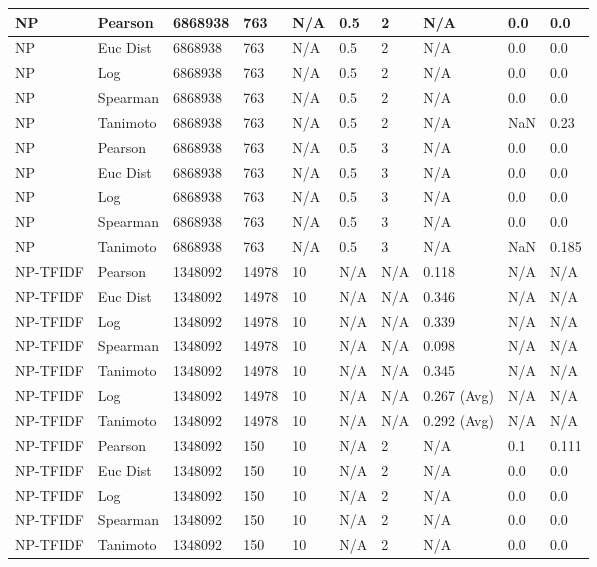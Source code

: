 \documentclass{article}
\begin{document}
\begin{longtable}{ |p{1.7cm}|p{1.9cm}|p{1.5cm}|p{1.5cm}|p{0.75cm}|p{0.75cm}|p{0.75cm}|p{0.75cm}|p{1.5cm}|p{1.5cm}|}
    NP & Pearson & 6868938 & 763 & N/A &  0.5  & 2 & N/A & 0.0 & 0.0  \\ \hline
    NP & Euc Dist & 6868938 & 763 & N/A &  0.5  &  2 & N/A &0.0 & 0.0   \\ \hline
    NP & Log & 6868938 & 763 & N/A &  0.5  &  2 & N/A & 0.0 & 0.0 \\ \hline
    NP & Spearman & 6868938 & 763 & N/A &  0.5  &  2 & N/A & 0.0 & 0.0 \\ \hline
    NP & Tanimoto & 6868938 & 763 & N/A &  0.5  &  2 & N/A & NaN & 0.23 \\ \hline
    
    NP & Pearson & 6868938 & 763 & N/A &  0.5  & 3 & N/A & 0.0 & 0.0  \\ \hline
    NP & Euc Dist & 6868938 & 763 & N/A &  0.5  & 3  & N/A &0.0 & 0.0   \\ \hline
    NP & Log & 6868938 & 763 & N/A &  0.5  & 3  & N/A & 0.0 & 0.0  \\ \hline
    NP & Spearman & 6868938 & 763 & N/A &  0.5  & 3  & N/A &0.0 & 0.0 \\ \hline
    NP & Tanimoto & 6868938 & 763 & N/A &  0.5  & 3 & N/A & NaN & 0.185 \\ \hline
    
    NP-TFIDF & Pearson & 1348092 & 14978 & 10 & N/A & N/A & 0.118 & N/A & N/A  \\ \hline
    NP-TFIDF  & Euc Dist & 1348092 & 14978 & 10 & N/A & N/A & 0.346 & N/A & N/A   \\ \hline
    NP-TFIDF  & Log & 1348092 & 14978 & 10 & N/A &  N/A& 0.339 & N/A & N/A  \\ \hline
    NP-TFIDF  & Spearman & 1348092 & 14978 & 10 & N/A & N/A & 0.098  & N/A & N/A \\ \hline
    NP-TFIDF  & Tanimoto & 1348092 & 14978 & 10 & N/A& N/A & 0.345 & N/A & N/A \\ \hline
    NP-TFIDF  & Log & 1348092 & 14978 & 10 & N/A& N/A & 0.267 (Avg) & N/A & N/A \\ \hline
    NP-TFIDF  & Tanimoto & 1348092 & 14978 & 10 & N/A & N/A & 0.292 (Avg) & N/A & N/A \\ \hline
    
    NP-TFIDF  & Pearson & 1348092 & 150 & 10 & N/A  & 2 & N/A & 0.1 & 0.111  \\ \hline
    NP-TFIDF  & Euc Dist & 1348092 & 150 & 10 & N/A  & 2 & N/A &0.0 & 0.0   \\ \hline
    NP-TFIDF  & Log & 1348092 & 150 & 10 & N/A & 2 & N/A & 0.0 & 0.0  \\ \hline
    NP-TFIDF  & Spearman & 1348092 & 150 & 10 & N/A  & 2 & N/A &0.0 & 0.0 \\ \hline
    NP-TFIDF  & Tanimoto & 1348092 & 150 & 10 & N/A  & 2 & N/A & 0.0 & 0.0 \\ \hline
    

\end{longtable}
\end{document}
